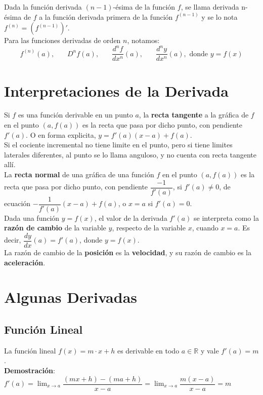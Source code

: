 \documentclass[11pt,a4paper]{article}
\begin{document}
Dada la funci\'on derivada $(n-1)$-\'esima de la funci\'on $f$, se llama derivada n-\'esima de $f$ a la funci\'on derivada primera de la funci\'on $f^{(n-1)}$ y se lo nota $f^{(n)} = \left(f^{(n-1)}\right)'$.\\
Para las funciones derivadas de orden $n$, notamos:
$$f^{(n)}(a),\ \ \ \ \ \ \ \ D^nf(a),\ \ \ \ \ \ \ \ \dfrac{d^nf}{dx^n}(a),\ \ \ \ \ \ \ \ \dfrac{d^ny}{dx^n}(a), \text{ donde $y=f(x)$}$$

\section{Interpretaciones de la Derivada}
\indent \indent Si $f$ es una funci\'on derivable en un punto $a$, la \textbf{recta tangente} a la gr\'afica de $f$ en el punto $(a,f(a))$ es la recta que pasa por dicho punto, con pendiente $f'(a)$. O en forma explicita, $y = f'(a)(x-a)+f(a)$.\\

Si el cociente incremental no tiene limite en el punto, pero si tiene limites laterales diferentes, al punto se lo llama anguloso, y no cuenta con recta tangente all\'i.\\

La \textbf{recta normal} de una gr\'afica de una funci\'on $f$ en el punto $(a,f(a))$ es la recta que pasa por dicho punto, con pendiente $\dfrac{-1}{f'(a)}$, si $f'(a)\not=0$, de ecuaci\'on $-\dfrac{1}{f'(a)}(x-a)+f(a)$, o $x=a$ si $f'(a)=0$.\\

Dada una funci\'on $y=f(x)$, el valor de la derivada $f'(a)$ se interpreta como la \textbf{raz\'on de cambio} de la variable $y$, respecto de la variable $x$, cuando $x=a$. Es decir, $\dfrac{dy}{dx}(a) = f'(a)$, donde $y=f(x)$.\\

La raz\'on de cambio de la \textbf{posici\'on} es la \textbf{velocidad}, y su raz\'on de cambio es la \textbf{aceleraci\'on}.

\section{Algunas Derivadas}
\subsection{Funci\'on Lineal}
La funci\'on lineal $f(x) = m\cdot x + h$ es derivable en todo $a\in\mathbb{R}$ y vale $f'(a)=m$.\\
\textbf{Demostraci\'on}: $\displaystyle{f'(a) = \lim_{x \to a} \dfrac{(mx+h)-(ma+h)}{x-a} = \lim_{x \to a} \dfrac{m(x-a)}{x-a}=m }$
\end{document}
